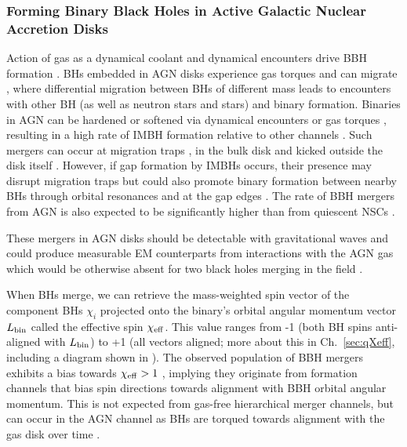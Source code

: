 \subsubsection{Forming Binary Black Holes in Active Galactic Nuclear Accretion Disks}
Action of gas as a dynamical coolant and dynamical encounters drive BBH formation \citep[e.g.][]{Rowan+23,QianLiLai24,DodiciTremaine24}.
BHs embedded in AGN disks experience gas torques and can migrate \citep[e.g.][]{Syer+91,Levin07,McKernan+12}, where differential migration between BHs of different mass leads to encounters with other BH (as well as neutron stars and stars) and binary formation.
Binaries in AGN can be hardened or softened via dynamical encounters \citep[e.g.][]{Leigh+18,Samsing+20,Wang+21} or gas torques  \citep[e.g.][]{Tiede+20,Derdzinski+21,YapingLi+21}, resulting in a high rate of IMBH formation relative to other channels \citep{McKernan+12,Bellovary+16,Secunda+21,Yang+19,McKernan+20a,TagawaHaimanKocsis20,Vaccaro+24}.
Such mergers can occur at migration traps \citep[e.g.][]{Lyra+10,Sandor+11,Horn+12,Bellovary+16,Yang+19,Secunda+20}, in the bulk disk \citep[e.g.][]{Tagawa+20spin,McKernan+20a} and kicked outside the disk itself \citep{Tagawa+20b}.
However, if gap formation by IMBHs occurs, their presence may disrupt migration traps \citep{Gilbaum+25} but could also promote binary formation between nearby BHs through orbital resonances \citep{Horn+12} and at the gap edges \citep{KuchnerLecar02,Masset+06}.
The rate of BBH mergers from AGN is also expected to be significantly higher than from quiescent NSCs \citep{FordMcKernan22}.

These mergers in AGN disks should be detectable with gravitational waves \citep{McKernan+14,Bartos+17,Stone+17,Secunda+19} and could produce measurable EM counterparts from interactions with the AGN gas which would be otherwise absent for two black holes merging in the field \citep{McKernan+19,Perna+21}.

When BHs merge, we can retrieve the mass-weighted spin vector of the component BHs $\chi_i$ projected onto the binary's orbital angular momentum vector $L_{\rm bin}$ called the effective spin $\chi_{\rm eff}$.
This value ranges from -1 (both BH spins anti-aligned with $L_{\rm bin}$) to +1 (all vectors aligned; more about this in Ch.~\ref{sec:qXeff}, including a diagram shown in ).
The observed population of BBH mergers exhibits a bias towards $\chi_{\rm eff}>1$ \citep{Abbott+23-O3b}, implying they originate from formation channels that bias spin directions towards alignment with BBH orbital angular momentum.
This is not expected from gas-free hierarchical merger channels, but can occur in the AGN channel as BHs are torqued towards alignment with the gas disk over time \citep{Tagawa+20spin,Vajpeyi+22,McKernanFord24}.

